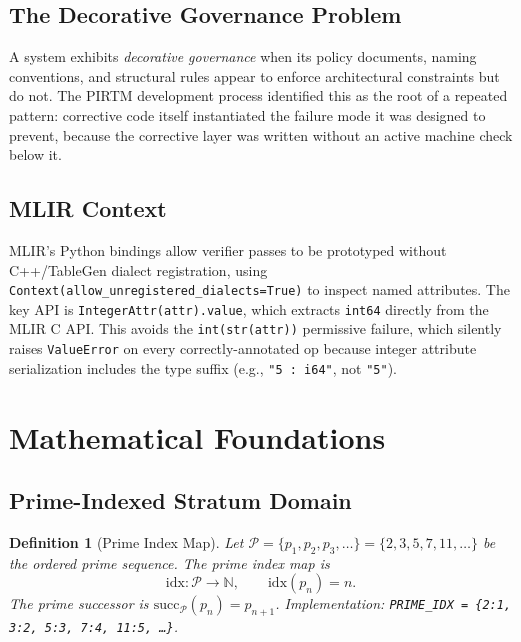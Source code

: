 \documentclass[11pt,letterpaper]{article}
\theoremstyle{pirtmthm}
\newtheorem{definition}{Definition}[section]
\theoremstyle{remark}
\begin{document}
\subsection{The Decorative Governance Problem}

A system exhibits \emph{decorative governance} when its policy documents,
naming conventions, and structural rules appear to enforce architectural
constraints but do not.
The PIRTM development process identified this as the root of a repeated pattern:
corrective code itself instantiated the failure mode it was designed to prevent,
because the corrective layer was written without an active machine check below it.

\subsection{MLIR Context}

MLIR's Python bindings allow verifier passes to be prototyped without
C++/TableGen dialect registration, using
\texttt{Context(allow\_unregistered\_dialects=True)} to inspect named attributes.
The key API is \texttt{IntegerAttr(attr).value}, which extracts \texttt{int64}
directly from the MLIR C API.
This avoids the \texttt{int(str(attr))} permissive failure, which silently raises
\texttt{ValueError} on every correctly-annotated op because integer attribute
serialization includes the type suffix (e.g., \texttt{"5 : i64"}, not \texttt{"5"}).

\section{Mathematical Foundations}

\subsection{Prime-Indexed Stratum Domain}

\begin{definition}[Prime Index Map]
Let $\mathcal{P} = \{p_1, p_2, p_3, \ldots\} = \{2, 3, 5, 7, 11, \ldots\}$
be the ordered prime sequence.
The \emph{prime index map} is
\[
  \mathrm{idx} : \mathcal{P} \to \mathbb{N}, \qquad \mathrm{idx}(p_n) = n.
\]
The \emph{prime successor} is
$\mathrm{succ}_{\mathcal{P}}(p_n) = p_{n+1}$.
Implementation: \texttt{PRIME\_IDX = \{2:1, 3:2, 5:3, 7:4, 11:5, \ldots\}}.
\end{definition}
\end{document}
